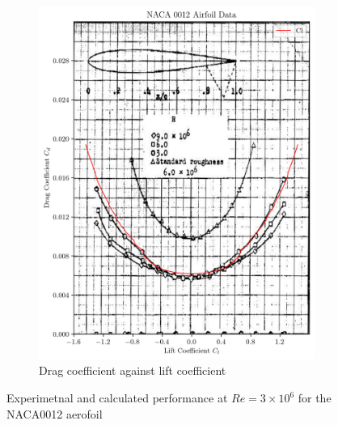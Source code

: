 \documentclass{article}
\begin{document}
\begin{figure}[H]
\begin{subfigure}{0.45\textwidth}
        \includegraphics[width=0.99\textwidth]{figures/NACA0012_drag_validation.png}
        \caption{Drag coefficient against lift coefficient}
        \label{fig:0012_drag_validation}
    \end{subfigure}
    \caption{Experimetnal and calculated performance at $Re = 3\times10^6$ for the NACA0012 aerofoil}
\end{figure}
\end{document}
